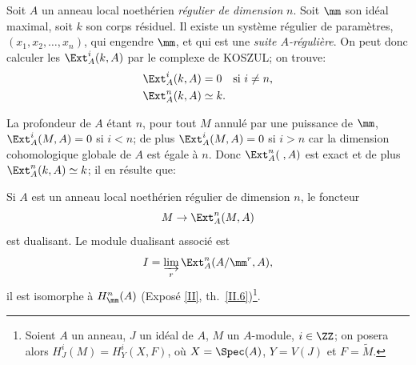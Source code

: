\begin{exemple} \label{IV.5.3}
Soit $A$ un anneau local noeth\'erien \emph{régulier de dimension} $n$. Soit $\mm$ son id\'eal maximal, soit $k$ son corps r\'esiduel. Il existe un syst\`eme r\'egulier de param\`etres, $(x_{1}, x_{2}, \ldots, x_{n})$, qui engendre $\mm$, et qui est une \emph{suite $A$-régulière}. On peut donc calculer les $\Ext^{i}_{A}(k, A)$ par le complexe de KOSZUL; on trouve:
\begin{align*}
\Ext^{i}_{A}(k, A)&=0\quad \text{si } i\neq n,\\
\Ext^{n}_{A}(k, A)&\simeq k.
\end{align*}

La profondeur de $A$ \'etant $n$, pour tout $M$ annul\'e par une puissance de $\mm$, $\Ext^{i}_{A}(M, A)=0$ si $i<n$; de plus $\Ext^{i}_{A}(M, A)=0$ si $i>n$ car la dimension cohomologique globale de $A$ est \'egale \`a $n$. Donc $\Ext^{n}_{A}(\;, A)$ est exact et de plus $\Ext^{n}_{A}(k, A)\simeq k$; il en r\'esulte que:
\end{exemple}

\begin{proposition} \label{IV.5.4}
Si $A$ est un anneau local noeth\'erien r\'egulier de dimension $n$, le foncteur
$$
M\to \Ext_{A}^{n}(M, A)
$$
est dualisant. Le module dualisant associ\'e est
$$
I=\varinjlim_{r}\Ext_{A}^{n}(A/\mm^{r}, A),
$$
il est isomorphe \`a $H^{n}_{\mm}(A)$ (Expos\'e \ref{II}, th.\, \ref{II.6})\footnote{Soient $A$ un anneau, $J$ un id\'eal de $A$, $M$ un $A$-module, $i\in \ZZ$; on posera alors $H^{i}_{J}(M)=H^{i}_{Y}(X, F)$, o\`u $X={\Spec}(A)$, $Y=V(J)$ et $F=\tilde{M}$.}.
\end{proposition}

